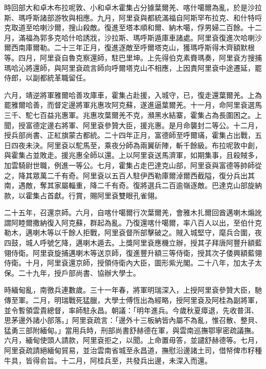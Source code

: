 \begin{pinyinscope}
時回部大和卓木布拉呢敦、小和卓木霍集占分據葉爾羌、喀什噶爾為亂，於是沙拉斯、瑪呼斯諸部游牧與相應。九月，阿里袞與都統滿福自阿斯罕布拉克、和什特哷克取道至哈喇沙爾，搜山殺敵。復進至塔本順和爾、納木噶，俘男婦二百餘。十二月，滿福為郭多克哈什哈誘戕，沙拉斯、瑪呼斯遁庫車諸處。阿里袞復進次哈喇沙爾西南庫爾勒。二十三年正月，復進逐敵至呼爾塔克山，獲瑪呼斯得木齊額默根等。四月，阿里袞自魯克察還師，駐巴里坤。上先得伯克素賚瑪奏，阿里袞方搜捕瑪哈沁將還師，與阿里袞疏言師向呼爾塔克山不相應，上因責阿里袞中途遷延，罷侍郎，以副都統革職留任。

六月，靖逆將軍雅爾哈善攻庫車，霍集占赴援，入城守，已，復走還葉爾羌。上為罷雅爾哈善，而督定邊將軍兆惠攻阿克蘇，遂進逼葉爾羌。十一月，命阿里袞選馬三千、駝七百益兆惠軍。兆惠攻葉爾羌不克，瀕黑水結寨，霍集占為長圍困之。上聞，授富德定邊右將軍、阿里袞參贊大臣，援兆惠。是月命襲封二等公。十二月，授兵部尚書、正紅旗蒙古都統。二十四年正月，富德師至呼爾璊，霍集占出戰，五日四夜未決。阿里袞以駝馬至，乘夜分師為兩翼斫陣，斬千餘級。布拉呢敦中創，與霍集占並敗走。援兆惠全師以還。上以阿里袞送馬濟軍，如期集事，且殺賊多，加雲騎尉世職，例進一等公。七月，霍集占走巴達克山部，阿里袞與富德等帥師從之，降其眾萬二千有奇。阿里袞以五百人駐伊西勒庫爾淖爾西截隘，復分兵出其南，遇敵，奪其家屬輜重，降二千有奇。復將選兵二百逾嶺逐敵。巴達克山部旋納款，以霍集占首獻。行賞，賜阿里袞雙眼孔雀翎。

二十五年，召還京師。六月，自喀什噶爾行次葉爾羌，會雅木扎爾回酋邁喇木煽訛謂阿睦爾撒納復入阿克蘇，群起為亂。乃復還喀什噶爾，率八百人以出，至伯什克勒木，邁喇木等以千餘人拒戰，阿里袞督所部擊破之。賊入城堅守，麾兵合圍，夜四鼓，城人呼號乞降，邁喇木遁去。上獎阿里袞應機立辦，授其子拜唐阿豐升額藍翎侍衛。阿里袞旋捕邁喇木等送京師，復進豐升額三等侍衛，授其次子倭興額藍翎侍衛。十月，阿里袞還京師，授領侍衛內大臣，圖形紫光閣。二十八年，加太子太保。二十九年，授戶部尚書、協辦大學士。

時緬甸亂，南徼兵連數歲。三十一年春，將軍明瑞深入，上授阿里袞參贊大臣，馳傳至軍。二月，明瑞戰死猛臘，大學士傅恆出為經略，授阿里袞及阿桂為副將軍，並令暫領雲貴總督，率師駐永昌。朝議：「明年進兵。今歲秋夏瘴退，先收普洱、思茅邊外諸小部落。」阿里袞疏言：「邊外十三板納皆內屬不為亂，惟召散、整貝、猛勇三部附緬甸。」當用兵時，刑部尚書舒赫德在軍，與雲南巡撫鄂寧密疏議撫。六月，緬甸使頭人請款，阿里袞拒之，以聞。上命置毋答，並譴舒赫德等。七月，阿里袞疏請絕緬甸貿易，並治雲南省城至永昌道，撫慰沿邊諸土司，借帑俾市籽種牛具，皆得俞旨。十二月，阿桂兵至，共發兵出邊，未深入而還。


\end{pinyinscope}
